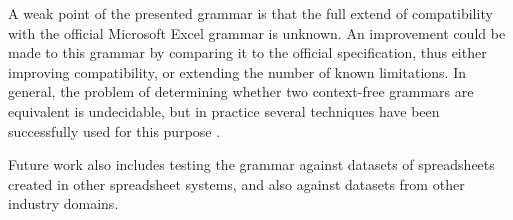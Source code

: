\documentclass[conference]{IEEEtran}
\begin{document}
A weak point of the presented grammar is that the full extend of compatibility with the official Microsoft Excel grammar is unknown.
An improvement could be made to this grammar by comparing it to the official specification, thus either improving compatibility, or extending the number of known limitations.
In general, the problem of determining whether two context-free grammars are equivalent is undecidable, but in practice several techniques have been successfully used for this purpose \cite{lammel2009introduction,fischer2012comparison}.

Future work also includes testing the grammar against datasets of spreadsheets created in other spreadsheet systems, and also against datasets from other industry domains.




\end{document}
